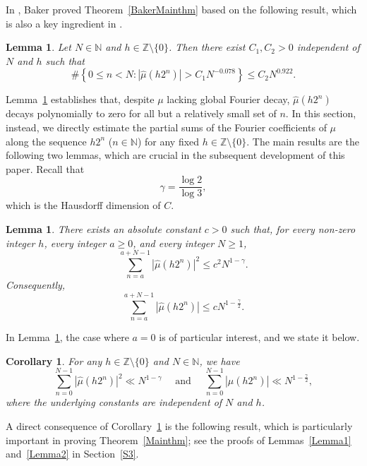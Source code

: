 \documentclass[10pt,a4paper]{amsart}
\numberwithin{equation}{section} %
\newtheorem{lem}[thm]{Lemma}
\newtheorem{cor}[thm]{Corollary}
\newcommand{\N}{\mathbb{N}}
\newcommand{\Z}{\mathbb{Z}}
\begin{document}
In \cite{Baker25A}, Baker proved  Theorem~\ref{BakerMainthm} based on the following result, which is also a key ingredient in \cite{ABCY23A}. 
\begin{lem}\cite[Lemma 2.2]{Baker25A}\label{Bakerlemma}
	Let $N\in\mathbb{N}$ and $h\in\mathbb{Z}\setminus \{0\}$. Then there exist $C_{1},C_{2}>0$ independent of $N$ and $h$ such that 
	$$\# \left\{0\leq n<N:\left|\widehat{\mu}(h 2^n)\right|> C_{1}N^{-0.078}\right\}\leq C_{2}N^{0.922}.$$
\end{lem}
Lemma~\ref{Bakerlemma} establishes  that,  despite  $\mu$ lacking global Fourier decay, $\widehat{\mu}(h 2^n)$ decays polynomially to zero for all but a  relatively small set of $n$. In this section, instead,  we directly estimate the partial sums of the Fourier coefficients of $\mu$ along the sequence $h2^n$ ($n\in\N$) for any fixed $h\in\Z\setminus\{0\}$. 
The main results are the following two lemmas, which are crucial in the subsequent  development of this paper. Recall that
\[\gamma=\frac{\log2}{\log3},\]
which is the Hausdorff dimension of $C$. 
\begin{lem}\label{LemL2-dyadic}
	There exists an absolute constant $c>0$ such that, for every non-zero integer $h$, every integer $a\ge 0$, and every integer $N\ge 1$,
\begin{equation}\label{eq:L2-main}
		\sum_{n=a}^{a+N-1}|\widehat\mu(h2^n)|^2
		\leq c^2 N^{1-\gamma}.
	\end{equation}
	Consequently, 
\begin{equation}\label{eq:L1-main}
		\sum_{n=a}^{a+N-1}|\widehat\mu(h2^n)|
		\leq c N^{1-\frac{\gamma}{2}}.
	\end{equation}
\end{lem}
In Lemma~\ref{LemL2-dyadic},
the case where $a=0$ is of particular interest, and we state it below.
\begin{cor}\label{cor:prefix}
	For any $h\in\Z\setminus\{0\}$ and  $N\in \N$, we have 
	\begin{equation*}\label{eqsumestimate}
		\sum_{n=0}^{N-1}|\widehat\mu(h2^n)|^2
		\ll N^{1-\gamma} \quad \text{ and }\quad 
		\sum_{n=0}^{N-1}|\widehat\mu(h2^n)|
		\ll N^{1-\frac{\gamma}{2}},
	\end{equation*}
	where the underlying constants are independent of $N$ and  $h$. 
\end{cor}

A direct consequence of Corollary~\ref{cor:prefix} is the following result, which is particularly important in proving Theorem~\ref{Mainthm}; see the proofs of Lemmas~\ref{Lemma1} and~\ref{Lemma2} in Section~\ref{S3}.
\end{document}

